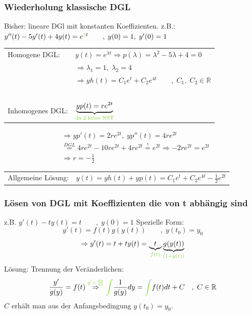 \documentclass[12pt,a4paper]{report}%
\numberwithin{equation}{section}
\newcommand{\R}{\mathbb{R}} %
\def\colGreen#1{\begingroup\color{LimeGreen}{#1}\endgroup}
\def\ubGreen#1#2{\underbrace{#2}_{\colGreen{#1}}}
\numberwithin{equation}{subsection}
\begin{document}
  \subsubsection{Wiederholung klassische DGL}
  Bisher: lineare DGl mit konstanten Koeffizienten. \newline
  z.B.: $y''(t) - 5y'(t) + 4y(t) = e^{\colGreen{2}t} \qquad ,\; y(0) = 1,\; y'(0) = 1$ \newline
  \begin{tabularx}{14.7cm}{l l}
	  Homogene DGL: & $y(t) = e^{\lambda t} \Rightarrow p(\lambda) = \lambda^2 - 5 \lambda +4 = 0$ \\
	  $\;$ & $\Rightarrow \lambda_1 = 1, \; \lambda_2 = 4$ \\
	  $\;$ & $\Rightarrow yh(t) = C_1 e^t + C_2 e^{4t} \qquad ,\;C_1,\;C_2 \in \R$\\
	  $\;$ & $\;$ \\
	  Inhomogenes DGL: & $\ubGreen{\text{da 2 keine NST}}{yp(t) = re^{2t}}$\\
  \end{tabularx}  
  \begin{align*}
    &\Rightarrow yp'(t) = 2re^{2t},\; yp''(t) = 4re^{2t} \\
    &\overset{DGL}{=} 4re^{2t} - 10re^{2t} + 4re^{2t} \overset{!}{=} e^{2t} \Rightarrow -2re^{2t} = e^{2t}\\
    &\Rightarrow r = -\frac{1}{2}
  \end{align*} 
  \begin{tabularx}{14.7cm}{l l}
	  Allgemeine Lösung: & $y(t) = yh(t) + yp(t) = C_1 e^t + C_2 e^{4t} - \frac{1}{2} e^{2t}$
  \end{tabularx}
  
  \subsubsection{Lösen von DGL mit Koeffizienten die von t abhängig sind}
  z.B. $ y'(t) - ty(t) = t \qquad ,\; y(0) = 1$\newline
  \newline
  Spezielle Form: 
  \begin{equation}
    y'(t) = f(t) g(y(t)) \qquad,\; y(t_0) = y_0
  \end{equation}     
  \begin{align*}
    \Rightarrow y'(t) = t+ty(t) = \ubGreen{f(t)}{t} \ubGreen{(1+y(t))}{g(y(t))}
  \end{align*}
  Lösung: Trennung der Veränderlichen:
  \begin{align}
  \frac{y'}{g(y)} = f(t) \overset{\colGreen{y' = \frac{dy}{dt}}}{\Rightarrow} \colGreen{\int} \frac{1}{g(y)} dy = \colGreen{\int} f(t)dt +C \quad ,\;C\in\R
  \end{align}
  $C$ erhält man aus der Anfangsbedingung $y(t_0) = y_0$.
  \newpage
	
\end{document}
